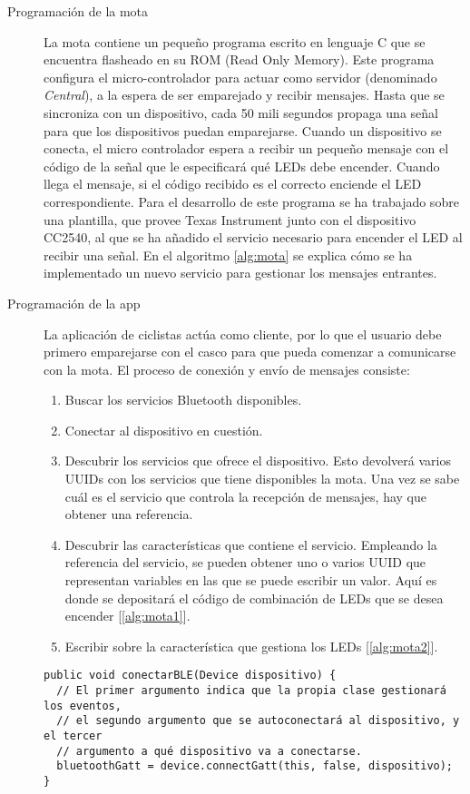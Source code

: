 \begin{description}
	\item[Programación de la mota] La mota contiene un pequeño programa escrito en lenguaje C que se encuentra flasheado en su ROM (Read Only Memory). Este programa configura el micro-controlador para actuar como servidor (denominado \emph{Central}), a la espera de ser emparejado y recibir mensajes. Hasta que se sincroniza con un dispositivo, cada 50 mili segundos propaga una señal para que los dispositivos puedan emparejarse. Cuando un dispositivo se conecta, el micro controlador espera a recibir un pequeño mensaje con el código de la señal que le especificará qué LEDs debe encender. Cuando llega el mensaje, si el código recibido es el correcto enciende el LED correspondiente. Para el desarrollo  de este programa se ha trabajado sobre una plantilla, que provee Texas Instrument junto con el dispositivo CC2540, al que se ha añadido el servicio necesario para encender el LED al recibir una señal. En el algoritmo \ref{alg:mota} se explica cómo se ha implementado un nuevo servicio para gestionar los mensajes entrantes.
	
	
	\item[Programación de la app] La aplicación de ciclistas actúa como cliente, por lo que el usuario debe primero emparejarse con el casco para que pueda comenzar a comunicarse con la mota. El proceso de conexión y envío de mensajes consiste:
		\begin{enumerate}
			\item Buscar los servicios Bluetooth disponibles.
			\item Conectar al dispositivo en cuestión.
			\item Descubrir los servicios que ofrece el dispositivo. Esto devolverá varios UUIDs con los servicios que tiene disponibles la mota. Una vez se sabe cuál es el servicio que controla la recepción de mensajes, hay que obtener una referencia. 
			\item Descubrir las características que contiene el servicio. Empleando la referencia del servicio, se pueden obtener uno o varios UUID que representan variables en las que se puede escribir un valor. Aquí es donde se depositará el código de combinación de LEDs que se desea encender [\ref{alg:mota1}].
			\item Escribir sobre la característica que gestiona los LEDs [\ref{alg:mota2}].
		\end{enumerate}
		
		\begin{listing}
			\begin{minipage}{.4\textwidth}
				\begin{verbatim}
public void conectarBLE(Device dispositivo) {
  // El primer argumento indica que la propia clase gestionará los eventos,
  // el segundo argumento que se autoconectará al dispositivo, y el tercer
  // argumento a qué dispositivo va a conectarse.
  bluetoothGatt = device.connectGatt(this, false, dispositivo);	
}


\end{verbatim}
\end{minipage}
\end{listing}
\end{description}

